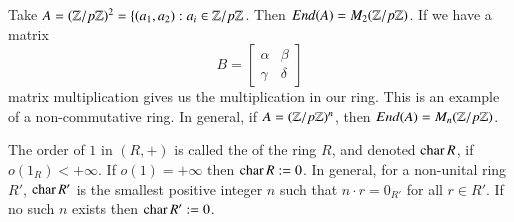 \begin{example}
        Take $A = (\mathbb Z/p\mathbb Z)^2 = \{(a_1,a_2): a_i \in \mathbb Z/p\mathbb Z$. Then $End(A) = M_2(\mathbb Z/p\mathbb Z)$. If we have a matrix \begin{equation}
                B = \begin{bmatrix} \alpha & \beta \\ \gamma & \delta \end{bmatrix}
        \end{equation}
        matrix multiplication gives us the multiplication in our ring. This is an example of a non-commutative ring. In general, if $A = (\mathbb Z/p\mathbb Z)^n$, then $End(A) = M_n(\mathbb Z/p\mathbb Z)$.
\end{example}


\begin{definition}
    The order of $1$ in $(R,+)$ is called the  of the ring $R$, and denoted $\operatorname{char} R$, if $o(1_R) < +\infty$. If $o(1) = +\infty$ then $\operatorname{char} R := 0$. In general, for a non-unital ring $R'$, $\operatorname{char} R'$ is the smallest positive integer $n$ such that $n\cdot r = 0_{R'}$ for all $r \in R'$. If no such $n$ exists then $\operatorname{char} R' := 0$. 
\end{definition}


